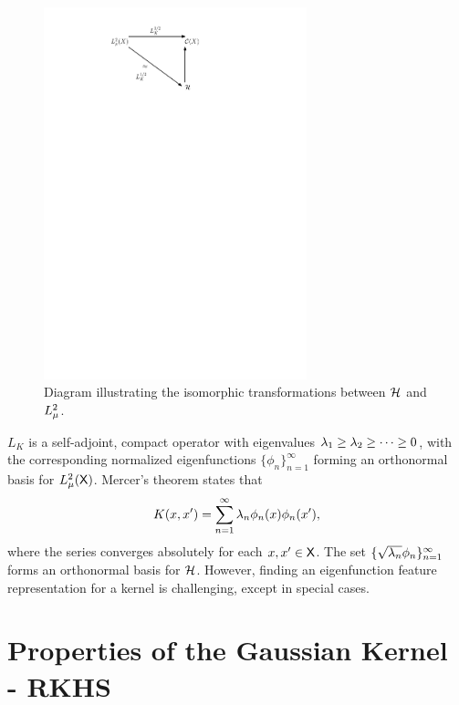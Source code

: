 \begin{figure}[htbp]
	\centering
	\includegraphics[width=3in]{images/Chap3_RKHS_isomorphism}
	\caption{Diagram illustrating the isomorphic transformations between ${\cal H}$ and $L^2_\mu$.}
	\label{fig:rkhs_isomorphism}
\end{figure}

 $L_K$ is a self-adjoint, compact operator with eigenvalues $\lambda_1 \geq \lambda_2 \geq \cdots \geq 0$, with the corresponding normalized eigenfunctions $\{\phi_n\}_{n=1}^\infty$ forming an orthonormal basis for $L^2_\mu({\sf X})$. Mercer's theorem states that 
\begin{equation}
K(x,x') = \sum_{n=1}^\infty \lambda_n \phi_n(x) \phi_n(x'),
\end{equation}
where the series converges absolutely for each $x,x' \in {\sf X}$. The set $\{\sqrt{\lambda_n}\phi_n\}_{n=1}^\infty$ forms an orthonormal basis for ${\cal H}$. However, finding an eigenfunction feature representation for a kernel is challenging, except in special cases. 

\section{Properties of the Gaussian Kernel -  RKHS}
\label{s:gaussian_rkhs}

